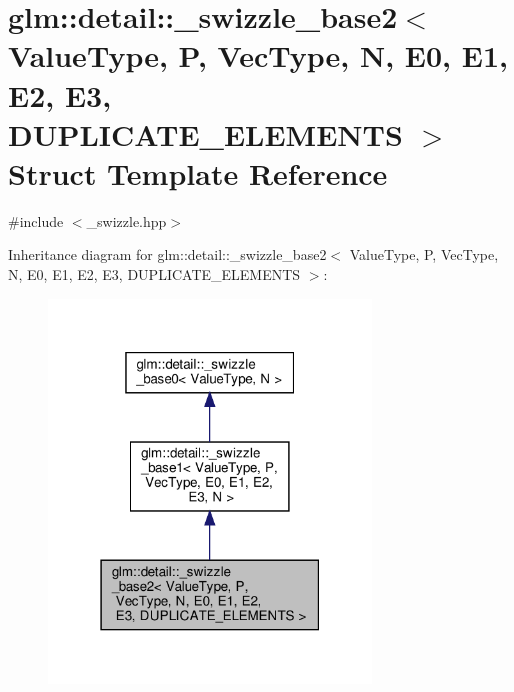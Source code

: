 \hypertarget{structglm_1_1detail_1_1__swizzle__base2}{}\section{glm\+:\+:detail\+:\+:\+\_\+swizzle\+\_\+base2$<$ Value\+Type, P, Vec\+Type, N, E0, E1, E2, E3, D\+U\+P\+L\+I\+C\+A\+T\+E\+\_\+\+E\+L\+E\+M\+E\+N\+TS $>$ Struct Template Reference}
\label{structglm_1_1detail_1_1__swizzle__base2}


{\ttfamily \#include $<$\+\_\+swizzle.\+hpp$>$}



Inheritance diagram for glm\+:\+:detail\+:\+:\+\_\+swizzle\+\_\+base2$<$ Value\+Type, P, Vec\+Type, N, E0, E1, E2, E3, D\+U\+P\+L\+I\+C\+A\+T\+E\+\_\+\+E\+L\+E\+M\+E\+N\+TS $>$\+:\nopagebreak
\begin{figure}[H]
\begin{center}
\leavevmode
\includegraphics[width=243pt]{structglm_1_1detail_1_1__swizzle__base2__inherit__graph}
\end{center}
\end{figure}


